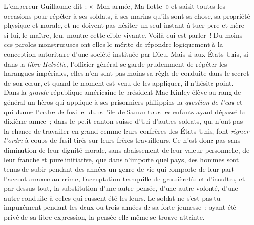 \documentclass[french,twoside]{book} %
\begin{document}
L’empereur Guillaume dit : « Mon armée, Ma flotte » et saisit toutes les occasions pour répéter à ses soldats, à  ses marins qu’ils sont sa chose, sa propriété physique et morale, et ne doivent pas hésiter un seul instant à tuer père et mère si lui, le maître, leur montre cette cible vivante. Voilà qui est parler ! Du moins ces paroles monstrueuses ont-elles le mérite de répondre logiquement à la conception autoritaire d’une société instituée par Dieu. Mais si aux États-Unis, si dans la \emph{libre Helvétie}, l’officier général se garde prudemment de répéter les harangues impériales, elles n’en sont pas moins sa règle de conduite dans le secret de son cœur, et quand le moment est venu de les appliquer, il n’hésite point. Dans la \emph{grande} république américaine le président Mac Kinley élève au rang de général un héros qui applique à ses prisonniers philippins la  \emph{question de l’eau} et qui donne l’ordre de fusiller dans l’île de Samar tous les enfants ayant dépassé la dixième année ; dans le petit canton suisse d’Uri d’autres soldats, qui n’ont pas la chance de travailler en grand comme leurs confrères des États-Unis, font \emph{régner l’ordre} à coups de fusil tirés sur leurs frères travailleurs. Ce n’est donc pas sans diminution de leur dignité morale, sans abaissement de leur valeur personnelle, de leur franche et pure initiative, que dans n’importe quel pays, des hommes sont tenus de subir pendant des années un genre de vie qui comporte de leur part l’accoutumance au crime, l’acceptation tranquille de grossièretés et d’insultes, et par-dessus tout, la substitution d’une autre pensée, d’une autre volonté, d’une  autre conduite à celles qui eussent été les leurs. Le soldat ne s’est pas tu impunément pendant les deux ou trois années de sa forte jeunesse : ayant été privé de sa libre expression, la pensée elle-même se trouve atteinte.\par
\end{document}
